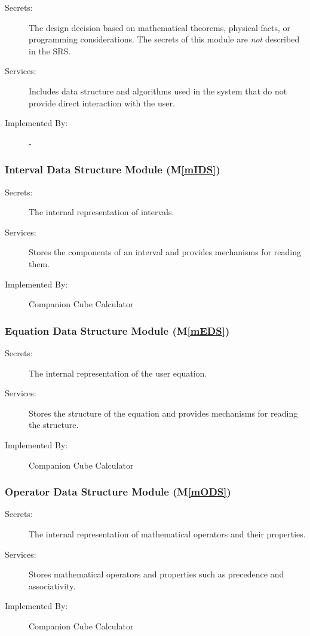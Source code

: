 \documentclass[12pt, titlepage]{article}
\newcommand{\mref}[1]{M\ref{#1}}
\newcommand{\progname}{Companion Cube Calculator} %
\begin{document}
\begin{description}
\item[Secrets:] The design decision based on mathematical theorems, physical
  facts, or programming considerations. The secrets of this module are
  \emph{not} described in the SRS.
\item[Services:] Includes data structure and algorithms used in the system that
  do not provide direct interaction with the user. 
\item[Implemented By:] -
\end{description}

\subsubsection{Interval Data Structure Module (\mref{mIDS})}

\begin{description}
	\item[Secrets:]The internal representation of intervals.
	\item[Services:]Stores the components of an interval and provides 
	mechanisms for reading them.
	\item[Implemented By:] \progname{}
\end{description}

\subsubsection{Equation Data Structure Module (\mref{mEDS})}

\begin{description}
	\item[Secrets:]The internal representation of the user equation.
	\item[Services:]Stores the structure of the equation and provides 
	mechanisms for reading the structure.
	\item[Implemented By:] \progname{}
\end{description}

\subsubsection{Operator Data Structure Module (\mref{mODS})}

\begin{description}
	\item[Secrets:]The internal representation of mathematical operators and their properties.
	\item[Services:]Stores mathematical operators and properties such as precedence and associativity.
	\item[Implemented By:] \progname{}
\end{description}
\end{document}
